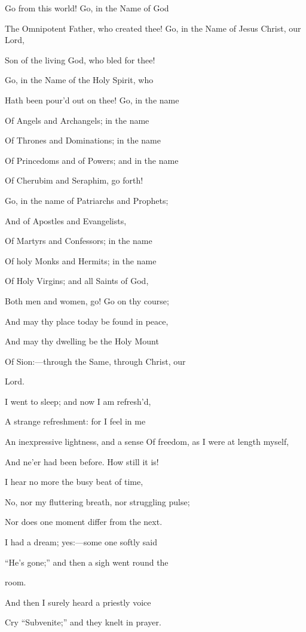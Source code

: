 Go from this world! Go, in the Name of God

The Omnipotent Father, who created thee! Go, in the Name of Jesus Christ, our Lord,

Son of the living God, who bled for thee!

Go, in the Name of the Holy Spirit, who

Hath been pour'd out on thee! Go, in the name

Of Angels and Archangels; in the name

Of Thrones and Dominations; in the name

Of Princedoms and of Powers; and in the name

Of Cherubim and Seraphim, go forth!

Go, in the name of Patriarchs and Prophets;

And of Apostles and Evangelists,

Of Martyrs and Confessors; in the name

Of holy Monks and Hermits; in the name

Of Holy Virgins; and all Saints of God,

Both men and women, go! Go on thy course;

And may thy place today be found in peace,

And may thy dwelling be the Holy Mount

Of Sion:—through the Same, through Christ, our

Lord.


I went to sleep; and now I am refresh'd,

A strange refreshment: for I feel in me

An inexpressive lightness, and a sense Of freedom, as I were at length myself,

And ne'er had been before. How still it is!

I hear no more the busy beat of time,

No, nor my fluttering breath, nor struggling pulse;

Nor does one moment differ from the next.

I had a dream; yes:—some one softly said

``He's gone;'' and then a sigh went round the

room.

And then I surely heard a priestly voice

Cry ``Subvenite;'' and they knelt in prayer.

